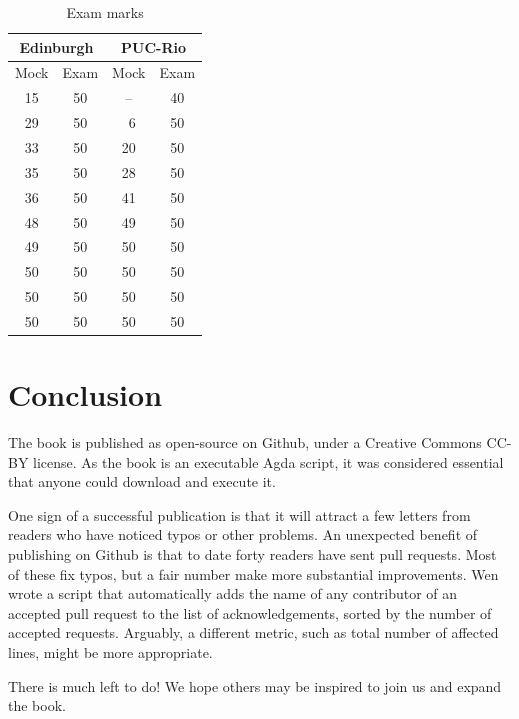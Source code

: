 \documentclass[preprint,authoryear]{elsarticle}
\begin{document}
\begin{table}
\begin{center}
  \begin{tabular}{|cc|cc|}
    \hline
    \multicolumn{2}{|c|}{Edinburgh} &
    \multicolumn{2}{c|}{PUC-Rio} \\
    \hline
    Mock & Exam & Mock & Exam \\
    \hline
     15  &  50  &  --  &  40  \\
     29  &  50  &  ~6  &  50  \\
     33  &  50  &  20  &  50  \\
     35  &  50  &  28  &  50  \\
     36  &  50  &  41  &  50  \\
     48  &  50  &  49  &  50  \\
     49  &  50  &  50  &  50  \\
     50  &  50  &  50  &  50  \\
     50  &  50  &  50  &  50  \\
     50  &  50  &  50  &  50  \\
    \hline
  \end{tabular}
\end{center}
\caption{Exam marks}
\label{tab:exam}
\end{table}

\section{Conclusion}

The book is published as open-source on Github, under a
Creative Commons CC-BY license.  As the book is an executable
Agda script, it was considered essential that anyone could
download and execute it.

One sign of a successful publication is that it will attract a few
letters from readers who have noticed typos or other problems.  An
unexpected benefit of publishing on Github is that to date forty
readers have sent pull requests.  Most of these fix typos, but a fair
number make more substantial improvements.  Wen wrote a script that
automatically adds the name of any contributor of an accepted pull
request to the list of acknowledgements, sorted by the number of
accepted requests.  Arguably, a different metric, such as total
number of affected lines, might be more appropriate.

There is much left to do!  We hope others may be inspired to join us
and expand the book.
\end{document}
